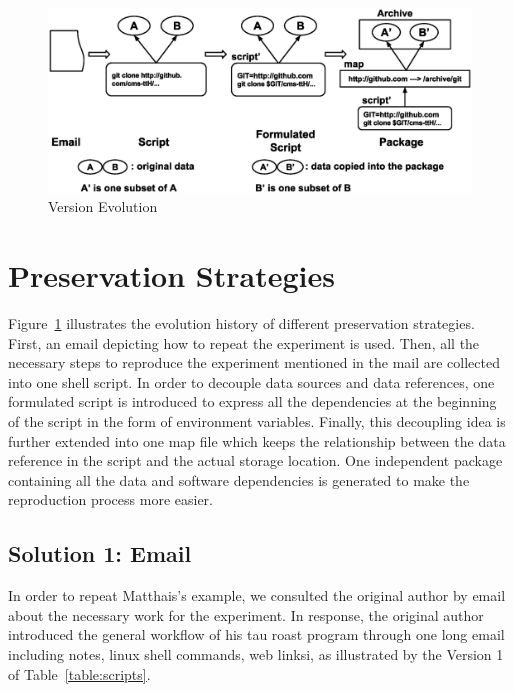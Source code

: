 \documentclass{sig-alternate}
\begin{document}
\begin{figure}
\centering
\includegraphics[width=1.6\columnwidth]{version-evolution.eps}
\caption{Version Evolution}
\label{fig:version-evolution}
\end{figure}
\fi

\section{Preservation Strategies}

Figure~\ref{fig:version-evolution} illustrates the evolution history of
different preservation strategies. First, an email depicting how to repeat the
experiment is used. Then, all the necessary steps to reproduce the experiment
mentioned in the mail are collected into one shell script. In order to decouple
data sources and data references, one formulated script is introduced
to express all the dependencies at the beginning of the script in the form of
environment variables. Finally, this decoupling idea is further extended into
one map file which keeps the relationship between the data reference in the
script and the actual storage location. One independent package containing all
the data and software dependencies is generated to make the reproduction
process more easier.  

\subsection{Solution 1: Email}

In order to repeat Matthais's example, we consulted the original
author by email about the necessary work for the experiment. In response,
the original author introduced the general workflow of his tau roast program through one long
email including notes, linux shell commands, web linksi, as illustrated by the Version 1 of
Table~\ref{table:scripts}.
\end{document}
